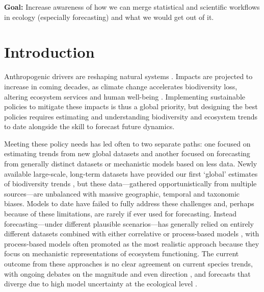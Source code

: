 \documentclass[11pt]{article}
\begin{document}
{\noindent \bf Goal:} Increase awareness of how we can merge statistical and scientific workflows in ecology (especially forecasting) and what we would get out of it.
\vspace*{0.5cm}

\section{Introduction}

Anthropogenic drivers are reshaping natural systems \citep{Diaz2019}. Impacts are projected to increase in coming decades, as climate change accelerates biodiversity loss, altering ecosystem services and human well-being \citep{IPBES2019}. %
Implementing sustainable policies to mitigate these impacts is thus a global priority, but designing the best policies requires estimating and understanding biodiversity and ecosystem trends to date alongside the skill to forecast future dynamics. %

Meeting these policy needs has led often to two separate paths: one focused on estimating trends from new global datasets and another focused on forecasting from generally distinct datasets or mechanistic models based on less data. Newly available large-scale, long-term datasets have provided our first `global' estimates of biodiversity trends \citep[e.g.][]{loh2005living,Dornelas2018}, but these data---gathered opportunistically from multiple sources---are unbalanced with massive geographic, temporal and taxonomic biases. Models to date have failed to fully address these challenges and, perhaps because of these limitations, are rarely if ever used for forecasting. 
Instead forecasting---under different plausible scenarios---has generally relied on entirely different datasets combined with either correlative or process-based models \citep{IPBES2019}, with process-based models often promoted as the most realistic approach \citep{Urban2016, Pilowsky2022} because they focus on mechanistic representations of ecosystem functioning. The current outcome from these approaches is no clear agreement on current species trends, with ongoing debates on the magnitude and even direction \citep{Dornelas2014, Leung2020, Buschke2021, Johnson2024}, and forecasts that diverge due to high model uncertainty at the ecological level \citep{Cheaib2012}. 
\end{document}
